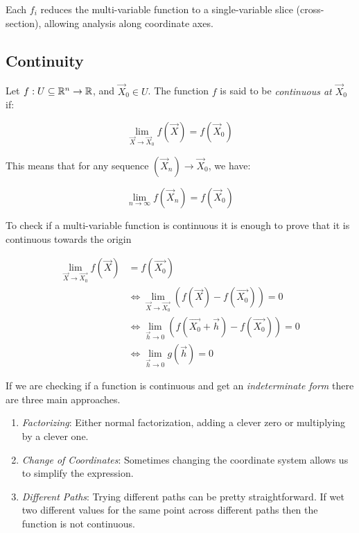 Each \( f_i \) reduces the multi-variable function to a single-variable slice (cross-section), 
allowing analysis along coordinate axes.

\subsection{Continuity}

Let \( f : U \subseteq \mathbb{R}^n \to \mathbb{R} \), and \( \vec{X}_0 \in U \). The function 
\(f\) is said to be \emph{continuous at \( \vec{X}_0 \)} if:

\[
    \lim_{\vec{X} \to \vec{X}_0} f(\vec{X}) = f(\vec{X}_0)
\]

This means that for any sequence \( (\vec{X}_n) \to \vec{X}_0 \), we have:

\[
    \lim_{n \to \infty} f(\vec{X}_n) = f(\vec{X}_0)
\]

To check if a multi-variable function is continuous it is enough to prove that it is continuous towards 
the origin

\begin{align*}
    \lim_{\vec{X} \to \vec{X_0}}f(\vec{X}) &= f(\vec{X_0}) \\
    &\iff \lim_{\vec{X} \to \vec{X_0}} \left(f(\vec{X}) - f(\vec{X_0})\right) = 0 \\
    &\iff \lim_{\vec{h} \to 0} \left(f(\vec{X_0} + \vec{h}) - f(\vec{X_0})\right) = 0 \\
    &\iff \lim_{\vec{h} \to 0} g(\vec{h}) = 0
\end{align*}

If we are checking if a function is continuous and get an \emph{indeterminate form} there are three main 
approaches.

\begin{enumerate}
    
    \item \emph{Factorizing}: Either normal factorization, adding a clever zero or multiplying by a clever 
          one.
    
    \item \emph{Change of Coordinates}: Sometimes changing the coordinate system allows us to simplify the 
          expression.
    
    \item \emph{Different Paths}: Trying different paths can be pretty straightforward. If wet two 
          different values for the same point across different paths then the function is not continuous.

\end{enumerate}


